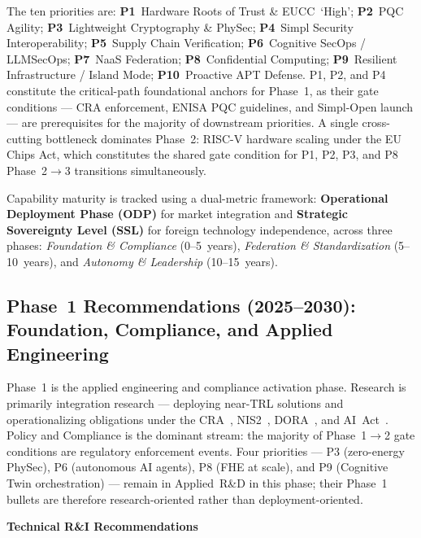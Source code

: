 \documentclass{ieeeaccess}
\begin{document}
The ten priorities are: \textbf{P1}~Hardware Roots of Trust \& EUCC~`High';
\textbf{P2}~PQC Agility; \textbf{P3}~Lightweight Cryptography \& PhySec;
\textbf{P4}~Simpl Security Interoperability; \textbf{P5}~Supply Chain
Verification; \textbf{P6}~Cognitive SecOps / LLMSecOps; \textbf{P7}~NaaS
Federation; \textbf{P8}~Confidential Computing; \textbf{P9}~Resilient
Infrastructure / Island Mode; \textbf{P10}~Proactive APT Defense.
P1, P2, and P4 constitute the critical-path foundational anchors for
Phase~1, as their gate conditions --- CRA enforcement, ENISA PQC guidelines,
and Simpl-Open launch --- are prerequisites for the majority of downstream
priorities. A single cross-cutting bottleneck dominates Phase~2: RISC-V
hardware scaling under the EU Chips Act, which constitutes the shared gate
condition for P1, P2, P3, and P8 Phase~2$\to$3 transitions simultaneously.

Capability maturity is tracked using a dual-metric framework:
\textbf{Operational Deployment Phase (ODP)} for market integration and
\textbf{Strategic Sovereignty Level (SSL)} for foreign technology
independence, across three phases: \emph{Foundation \& Compliance}
(0--5~years), \emph{Federation \& Standardization} (5--10~years), and
\emph{Autonomy \& Leadership} (10--15~years).

\subsection*{Phase~1 Recommendations (2025--2030):
             Foundation, Compliance, and Applied Engineering}

Phase~1 is the applied engineering and compliance activation phase.
Research is primarily integration research --- deploying near-TRL solutions
and operationalizing obligations under the CRA~\cite{cra},
NIS2~\cite{nis2}, DORA~\cite{dora}, and AI~Act~\cite{aiact}.
Policy and Compliance is the dominant stream: the majority of
Phase~1$\to$2 gate conditions are regulatory enforcement events.
Four priorities --- P3 (zero-energy PhySec), P6 (autonomous AI agents),
P8 (FHE at scale), and P9 (Cognitive Twin orchestration) --- remain
in Applied~R\&D in this phase; their Phase~1 bullets are therefore
research-oriented rather than deployment-oriented.

\textbf{Technical R\&I Recommendations}
\end{document}
